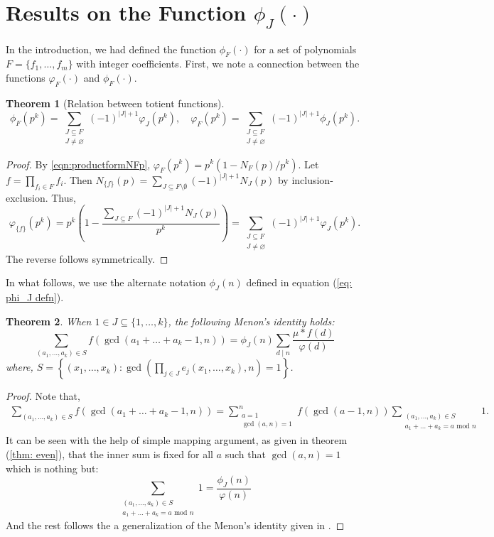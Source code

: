 \documentclass[12pt]{article}
\newtheorem{thm}{Theorem}[subsection]%
\begin{document}
\section{Results on the Function \texorpdfstring{$\phi_J(\cdot)$}{the stronger totient function}}\label{sect: phi_F}
In the introduction, we had defined the function $\phi_F(\cdot)$ for a set of polynomials $F=\{f_1,\dots, f_m\}$ with integer coefficients.
First, we note a connection between the functions $\varphi_F(\cdot)$ and $\phi_F(\cdot)$.
\begin{thm}[Relation between totient functions]\label{thm: relation_tot}
\[
\phi_F(p^k)=\sum_{\substack{J \subseteq F \\ J \ne \varnothing}}(-1)^{|J|+1}\varphi_J(p^k), \quad \varphi_F(p^k)=\sum_{\substack{J \subseteq F \\ J \ne \varnothing}}(-1)^{|J|+1}\phi_J(p^k).
\]
\end{thm}

\begin{proof}
By \eqref{eqn:productformNFp}, $\varphi_F(p^k)=p^k(1-N_F(p)/p^k)$. Let $f=\prod_{f_i\in F}f_i$. Then $N_{\{f\}}(p)=\sum_{J\subseteq F\setminus\emptyset}(-1)^{|J|+1}N_J(p)$ by inclusion-exclusion. Thus,
$$
\varphi_{\{f\}}(p^k)=p^k\left(1-\frac{\sum_{J\subseteq F}(-1)^{|J|+1}N_J(p)}{p^k}\right)=\sum_{\substack{J\subseteq F\\ J \ne \varnothing}}(-1)^{|J|+1}\varphi_J(p^k).
$$
The reverse follows symmetrically.
\end{proof}

In what follows, we use the alternate notation $\phi_J(n)$ defined in equation (\ref{eq: phi_J defn}).

\begin{thm}
    When $1\in J\subseteq\{1, \dots, k\}$, the following Menon's identity holds:\[
    \sum_{ (a_1,\dots,a_k)\in S}f(\gcd(a_1+\dots+a_k-1,n))=\phi_J(n)\sum_{d\mid n}\frac{\mu*f(d)}{\varphi(d)}
    \]
    where, $S=\left\{(x_1,\dots, x_k): \gcd\left(\prod_{j\in J}e_j(x_1,\dots, x_k), n\right)=1\right\}$.
\end{thm}
\begin{proof}
    Note that,
    \begin{align*}
        \sum_{(a_1,\dots, a_k)\in S}f(\gcd(a_1+\dots+a_k-1, n))=\sum_{\substack{a=1\\\gcd(a,n)=1}}^nf(\gcd(a-1, n))\sum_{\substack{(a_1,\dots, a_k)\in S\\a_1+\dots+a_k=a\text{ mod }n}}1.
    \end{align*}
    It can be seen with the help of simple mapping argument, as given in theorem (\ref{thm: even}), that the inner sum is fixed for all $a$ such that $\gcd(a, n)=1$ which is nothing but:\[
    \sum_{\substack{(a_1,\dots, a_k)\in S\\a_1+\dots+a_k=a\text{ mod }n}}1=\frac{\phi_J(n)}{\varphi(n)}
    \]
    And the rest follows the a generalization of the Menon's identity given in \cite[Theorem 4.2]{toth2021proofs}.
    \end{proof}
\end{document}
